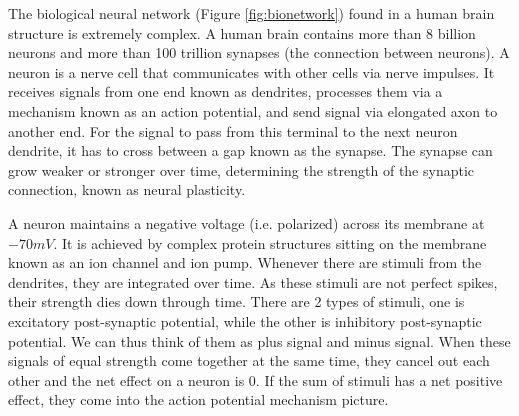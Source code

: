 The biological neural network (Figure \ref{fig:bionetwork}) found in a human brain structure is extremely complex. A human brain contains more than 8 billion neurons and more than 100 trillion synapses (the connection between neurons). A neuron is a nerve cell that communicates with other cells via nerve impulses. It receives signals from one end known as dendrites, processes them via a mechanism known as an action potential, and send signal via elongated axon to another end. For the signal to pass from this terminal to the next neuron dendrite, it has to cross between a gap known as the synapse. The synapse can grow weaker or stronger over time, determining the strength of the synaptic connection, known as neural plasticity.

A neuron maintains a negative voltage (i.e. polarized) across its membrane at $-70mV$. It is achieved by complex protein structures sitting on the membrane known as an ion channel and ion pump. Whenever there are stimuli from the dendrites, they are integrated over time. As these stimuli are not perfect spikes, their strength dies down through time. There are 2 types of stimuli, one is excitatory post-synaptic potential, while the other is inhibitory post-synaptic potential. We can thus think of them as plus signal and minus signal. When these signals of equal strength come together at the same time, they cancel out each other and the net effect on a neuron is 0. If the sum of stimuli has a net positive effect, they come into the action potential mechanism picture.

